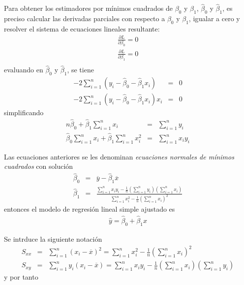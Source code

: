 \begin{itemize}
\begin{enumerate}
Para obtener los estimadores por m\'inimos cuadrados de $\beta_{0}$ y $\beta_{1}$, $\hat{\beta}_{0}$ y $\hat{\beta}_{1}$, es preciso calcular las derivadas parciales con respecto a $\beta_{0}$ y $\beta_{1}$, igualar a cero y resolver el sistema de ecuaciones lineales resultante:
\begin{eqnarray*}
\frac{\partial L}{\partial \beta_{0}}=0\\
\frac{\partial L}{\partial \beta_{1}}=0\\
\end{eqnarray*}
evaluando en $\hat{\beta}_{0}$ y $\hat{\beta}_{1}$, se tiene
\begin{eqnarray*}
-2\sum_{i=1}^{n}\left(y_{i}-\hat{\beta}_{0}-\hat{\beta}_{1}x_{i}\right)&=&0\\
-2\sum_{i=1}^{n}\left(y_{i}-\hat{\beta}_{0}-\hat{\beta}_{1}x_{i}\right)x_{i}&=&0
\end{eqnarray*}
simplificando
\begin{eqnarray*}
n\hat{\beta}_{0}+\hat{\beta}_{1}\sum_{i=1}^{n}x_{i}&=&\sum_{i=1}^{n}y_{i}\\
\hat{\beta}_{0}\sum_{i=1}^{n}x_{i}+\hat{\beta}_{1}\sum_{i=1}^{n}x_{i}^{2}&=&\sum_{i=1}^{n}x_{i}y_{i}
\end{eqnarray*}

Las ecuaciones anteriores se les denominan \textit{ecuaciones normales de m\'inimos cuadrados} con soluci\'on
\begin{eqnarray}\label{Ecs.Estimadores.Regresion}
\hat{\beta}_{0}&=&\overline{y}-\hat{\beta}_{1}\overline{x}\\
\hat{\beta}_{1}&=&\frac{\sum_{i=1}^{n}x_{i}y_{i}-\frac{1}{n}\left(\sum_{i=1}^{n}y_{i}\right)\left(\sum_{i=1}^{n}x_{i}\right)}{\sum_{i=1}^{n}x_{i}^{2}-\frac{1}{n}\left(\sum_{i=1}^{n}x_{i}\right)^{2}}
\end{eqnarray}
entonces el modelo de regresi\'on lineal simple ajustado es
\begin{eqnarray}
\hat{y}=\hat{\beta}_{0}+\hat{\beta}_{1}x
\end{eqnarray}

Se intrduce la siguiente notaci\'on
\begin{eqnarray}
S_{xx}&=&\sum_{i=1}^{n}\left(x_{i}-\overline{x}\right)^{2}=\sum_{i=1}^{n}x_{i}^{2}-\frac{1}{n}\left(\sum_{i=1}^{n}x_{i}\right)^{2}\\
S_{xy}&=&\sum_{i=1}^{n}y_{i}\left(x_{i}-\overline{x}\right)=\sum_{i=1}^{n}x_{i}y_{i}-\frac{1}{n}\left(\sum_{i=1}^{n}x_{i}\right)\left(\sum_{i=1}^{n}y_{i}\right)
\end{eqnarray}
y por tanto


\end{enumerate}
\end{itemize}
